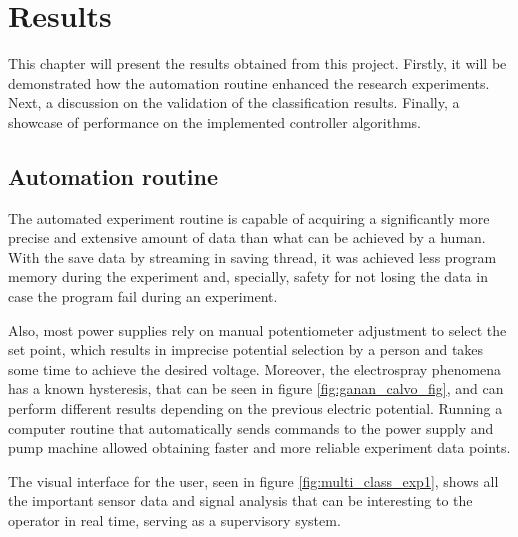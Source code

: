 \chapter{Results}
\label{chap:Results}

This chapter will present the results obtained from this project. 
Firstly, it will be demonstrated how the automation routine enhanced the research experiments. 
Next, a discussion on the validation of the classification results. 
Finally, a showcase of performance on the implemented controller algorithms.

\section{Automation routine}
\label{sec:automation_routine}

The automated experiment routine is capable of acquiring a significantly more precise and extensive amount of data than what can be achieved by a human. 
With the save data by streaming in saving thread, it was achieved less program memory during the experiment and, specially, safety for not losing the data in case the program fail during an experiment.

Also, most power supplies rely on manual potentiometer adjustment to select the set point, which results in imprecise potential selection by a person and takes some time to achieve the desired voltage.
Moreover, the electrospray phenomena has a known hysteresis, that can be seen in figure \ref{fig:ganan_calvo_fig}, and can perform different results depending on the previous electric potential.
Running a computer routine that automatically sends commands to the power supply and pump machine allowed obtaining faster and more reliable experiment data points.

The visual interface for the user, seen in figure \ref{fig:multi_class_exp1}, shows all the important sensor data and signal analysis that can be interesting to the operator in real time, serving as a supervisory system.

